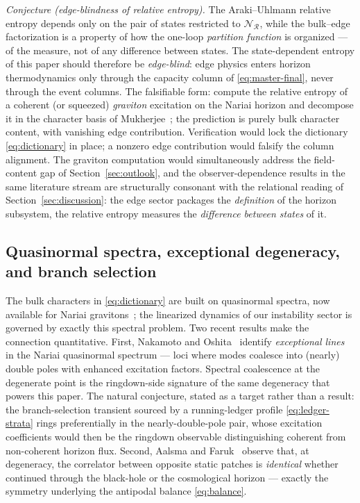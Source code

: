 \documentclass[11pt]{article}
\newcommand{\Nariai}{Nariai}
\begin{document}
\emph{Conjecture (edge-blindness of relative entropy).} The Araki--Uhlmann relative entropy depends only on the pair of states restricted to $\mathscr{N}_{\mathcal{R}}$, while the bulk--edge factorization is a property of how the one-loop \emph{partition function} is organized --- of the measure, not of any difference between states. The state-dependent entropy of this paper should therefore be \emph{edge-blind}: edge physics enters horizon thermodynamics only through the capacity column of \eqref{eq:master-final}, never through the event columns. The falsifiable form: compute the relative entropy of a coherent (or squeezed) \emph{graviton} excitation on the \Nariai{} horizon and decompose it in the character basis of Mukherjee~\cite{Mukherjee}; the prediction is purely bulk character content, with vanishing edge contribution. Verification would lock the dictionary \eqref{eq:dictionary} in place; a nonzero edge contribution would falsify the column alignment. The graviton computation would simultaneously address the field-content gap of Section~\ref{sec:outlook}, and the observer-dependence results in the same literature stream are structurally consonant with the relational reading of Section~\ref{sec:discussion}: the edge sector packages the \emph{definition} of the horizon subsystem, the relative entropy measures the \emph{difference between states} of it.

\subsection{Quasinormal spectra, exceptional degeneracy, and branch selection}
\label{app:qnm}

The bulk characters in \eqref{eq:dictionary} are built on quasinormal spectra, now available for \Nariai{} gravitons~\cite{Mukherjee}; the linearized dynamics of our instability sector is governed by exactly this spectral problem. Two recent results make the connection quantitative. First, Nakamoto and Oshita~\cite{NakamotoOshita} identify \emph{exceptional lines} in the \Nariai{} quasinormal spectrum --- loci where modes coalesce into (nearly) double poles with enhanced excitation factors. Spectral coalescence at the degenerate point is the ringdown-side signature of the same degeneracy that powers this paper. The natural conjecture, stated as a target rather than a result: the branch-selection transient sourced by a running-ledger profile \eqref{eq:ledger-strata} rings preferentially in the nearly-double-pole pair, whose excitation coefficients would then be the ringdown observable distinguishing coherent from non-coherent horizon flux. Second, Aalsma and Faruk~\cite{AalsmaFaruk} observe that, at degeneracy, the correlator between opposite static patches is \emph{identical} whether continued through the black-hole or the cosmological horizon --- exactly the symmetry underlying the antipodal balance \eqref{eq:balance}.
\end{document}
